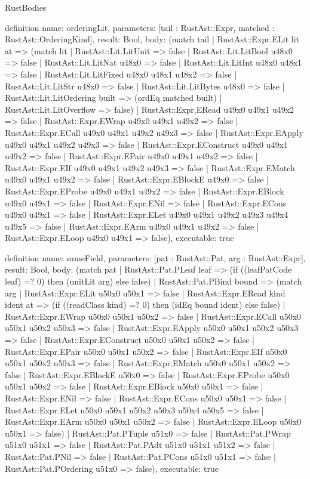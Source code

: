 \begin{lexlean}{RustBodies}
\begin{semanticmodule}
definition{
  name: orderingLit,
  parameters: [tail : RustAst::Expr, matched : RustAst::OrderingKind],
  result: Bool,
  body: (match tail
    | RustAst::Expr.ELit lit at => (match lit
      | RustAst::Lit.LitUnit => false
      | RustAst::Lit.LitBool u48x0 => false
      | RustAst::Lit.LitNat u48x0 => false
      | RustAst::Lit.LitInt u48x0 u48x1 => false
      | RustAst::Lit.LitFixed u48x0 u48x1 u48x2 => false
      | RustAst::Lit.LitStr u48x0 => false
      | RustAst::Lit.LitBytes u48x0 => false
      | RustAst::Lit.LitOrdering built => (ordEq matched built)
      | RustAst::Lit.LitOverflow => false)
    | RustAst::Expr.ERead u49x0 u49x1 u49x2 => false
    | RustAst::Expr.EWrap u49x0 u49x1 u49x2 => false
    | RustAst::Expr.ECall u49x0 u49x1 u49x2 u49x3 => false
    | RustAst::Expr.EApply u49x0 u49x1 u49x2 u49x3 => false
    | RustAst::Expr.EConstruct u49x0 u49x1 u49x2 => false
    | RustAst::Expr.EPair u49x0 u49x1 u49x2 => false
    | RustAst::Expr.EIf u49x0 u49x1 u49x2 u49x3 => false
    | RustAst::Expr.EMatch u49x0 u49x1 u49x2 => false
    | RustAst::Expr.EBlockE u49x0 => false
    | RustAst::Expr.EProbe u49x0 u49x1 u49x2 => false
    | RustAst::Expr.EBlock u49x0 u49x1 => false
    | RustAst::Expr.ENil => false
    | RustAst::Expr.ECons u49x0 u49x1 => false
    | RustAst::Expr.ELet u49x0 u49x1 u49x2 u49x3 u49x4 u49x5 => false
    | RustAst::Expr.EArm u49x0 u49x1 u49x2 => false
    | RustAst::Expr.ELoop u49x0 u49x1 => false),
  executable: true
}

definition{
  name: sameField,
  parameters: [pat : RustAst::Pat, arg : RustAst::Expr],
  result: Bool,
  body: (match pat
    | RustAst::Pat.PLeaf leaf => (if ((leafPatCode leaf) =? 0) then (unitLit arg) else false)
    | RustAst::Pat.PBind bound => (match arg
      | RustAst::Expr.ELit u50x0 u50x1 => false
      | RustAst::Expr.ERead kind ident at => (if ((readClass kind) =? 0) then (idEq bound ident) else false)
      | RustAst::Expr.EWrap u50x0 u50x1 u50x2 => false
      | RustAst::Expr.ECall u50x0 u50x1 u50x2 u50x3 => false
      | RustAst::Expr.EApply u50x0 u50x1 u50x2 u50x3 => false
      | RustAst::Expr.EConstruct u50x0 u50x1 u50x2 => false
      | RustAst::Expr.EPair u50x0 u50x1 u50x2 => false
      | RustAst::Expr.EIf u50x0 u50x1 u50x2 u50x3 => false
      | RustAst::Expr.EMatch u50x0 u50x1 u50x2 => false
      | RustAst::Expr.EBlockE u50x0 => false
      | RustAst::Expr.EProbe u50x0 u50x1 u50x2 => false
      | RustAst::Expr.EBlock u50x0 u50x1 => false
      | RustAst::Expr.ENil => false
      | RustAst::Expr.ECons u50x0 u50x1 => false
      | RustAst::Expr.ELet u50x0 u50x1 u50x2 u50x3 u50x4 u50x5 => false
      | RustAst::Expr.EArm u50x0 u50x1 u50x2 => false
      | RustAst::Expr.ELoop u50x0 u50x1 => false)
    | RustAst::Pat.PTuple u51x0 => false
    | RustAst::Pat.PWrap u51x0 u51x1 => false
    | RustAst::Pat.PAdt u51x0 u51x1 u51x2 => false
    | RustAst::Pat.PNil => false
    | RustAst::Pat.PCons u51x0 u51x1 => false
    | RustAst::Pat.POrdering u51x0 => false),
  executable: true
}


\end{semanticmodule}
\end{lexlean}
